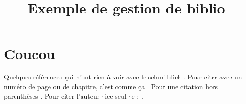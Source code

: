 \documentclass{article}
\title{Exemple de gestion de biblio}
\begin{document}


\maketitle

\section*{Coucou}

Quelques références qui n'ont rien à voir avec le schmilblick \parencite{bouchet-valat_hypergamie_2018}. Pour citer avec un numéro de page ou de chapitre, c'est comme ça \parencite[p. 19]{favier_se_2021}.  Pour une citation hors parenthèses \textcite{mcrobbie_notes_2004}. Pour citer l'auteur·ice seul·e : \citeauthor{skeggs_formations_1997}.



\printbibliography
\end{document}
